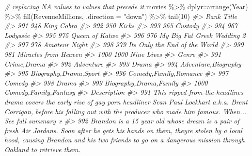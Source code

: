 \documentclass[
]{book}
\newenvironment{Shaded}{\begin{snugshade}}{\end{snugshade}}
\newcommand{\AttributeTok}[1]{\textcolor[rgb]{0.77,0.63,0.00}{#1}}
\newcommand{\CommentTok}[1]{\textcolor[rgb]{0.56,0.35,0.01}{\textit{#1}}}
\newcommand{\DecValTok}[1]{\textcolor[rgb]{0.00,0.00,0.81}{#1}}
\newcommand{\FunctionTok}[1]{\textcolor[rgb]{0.00,0.00,0.00}{#1}}
\newcommand{\NormalTok}[1]{#1}
\newcommand{\SpecialCharTok}[1]{\textcolor[rgb]{0.00,0.00,0.00}{#1}}
\newcommand{\StringTok}[1]{\textcolor[rgb]{0.31,0.60,0.02}{#1}}
\begin{document}
\begin{Shaded}
\begin{Highlighting}[]
\CommentTok{\# replacing NA values to values that precede it}
\NormalTok{movies }\SpecialCharTok{\%\textgreater{}\%}
\NormalTok{dplyr}\SpecialCharTok{::}\FunctionTok{arrange}\NormalTok{(Year) }\SpecialCharTok{\%\textgreater{}\%}
\FunctionTok{fill}\NormalTok{(RevenueMillions, }\AttributeTok{.direction =} \StringTok{"down"}\NormalTok{) }\SpecialCharTok{\%\textgreater{}\%}
\FunctionTok{tail}\NormalTok{(}\DecValTok{10}\NormalTok{)}
\CommentTok{\#\textgreater{}      Rank                          Title}
\CommentTok{\#\textgreater{} 991   948                     King Cobra}
\CommentTok{\#\textgreater{} 992   950                          Kicks}
\CommentTok{\#\textgreater{} 993   965                        Custody}
\CommentTok{\#\textgreater{} 994   967                      L\textquotesingle{}odyssée}
\CommentTok{\#\textgreater{} 995   975                 Queen of Katwe}
\CommentTok{\#\textgreater{} 996   976     My Big Fat Greek Wedding 2}
\CommentTok{\#\textgreater{} 997   978                  Amateur Night}
\CommentTok{\#\textgreater{} 998   979 It\textquotesingle{}s Only the End of the World}
\CommentTok{\#\textgreater{} 999   981           Miracles from Heaven}
\CommentTok{\#\textgreater{} 1000 1000                     Nine Lives}
\CommentTok{\#\textgreater{}                       Genre}
\CommentTok{\#\textgreater{} 991             Crime,Drama}
\CommentTok{\#\textgreater{} 992               Adventure}
\CommentTok{\#\textgreater{} 993                   Drama}
\CommentTok{\#\textgreater{} 994     Adventure,Biography}
\CommentTok{\#\textgreater{} 995   Biography,Drama,Sport}
\CommentTok{\#\textgreater{} 996   Comedy,Family,Romance}
\CommentTok{\#\textgreater{} 997                  Comedy}
\CommentTok{\#\textgreater{} 998                   Drama}
\CommentTok{\#\textgreater{} 999  Biography,Drama,Family}
\CommentTok{\#\textgreater{} 1000  Comedy,Family,Fantasy}
\CommentTok{\#\textgreater{}                                                                                                                                                                                                                                        Description}
\CommentTok{\#\textgreater{} 991                            This ripped{-}from{-}the{-}headlines drama covers the early rise of gay porn headliner Sean Paul Lockhart a.k.a. Brent Corrigan, before his falling out with the producer who made him famous. When... See full summary »}
\CommentTok{\#\textgreater{} 992  Brandon is a 15 year old whose dream is a pair of fresh Air Jordans. Soon after he gets his hands on them, they\textquotesingle{}re stolen by a local hood, causing Brandon and his two friends to go on a dangerous mission through Oakland to retrieve them.}

\end{Highlighting}
\end{Shaded}
\end{document}
